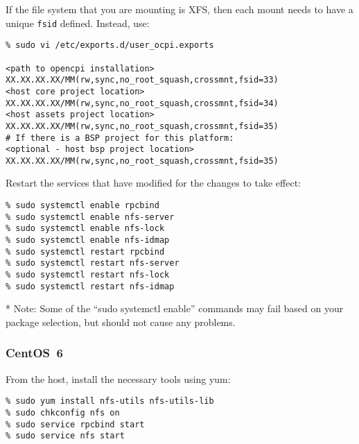 If the file system that you are mounting is XFS, then each mount needs to have a unique \texttt{fsid} defined. Instead, use:
\begin{verbatim}
% sudo vi /etc/exports.d/user_ocpi.exports

<path to opencpi installation>          XX.XX.XX.XX/MM(rw,sync,no_root_squash,crossmnt,fsid=33)
<host core project location>            XX.XX.XX.XX/MM(rw,sync,no_root_squash,crossmnt,fsid=34)
<host assets project location>          XX.XX.XX.XX/MM(rw,sync,no_root_squash,crossmnt,fsid=35)
# If there is a BSP project for this platform:
<optional - host bsp project location>  XX.XX.XX.XX/MM(rw,sync,no_root_squash,crossmnt,fsid=35)
\end{verbatim}

Restart the services that have modified for the changes to take effect:
\begin{verbatim}
% sudo systemctl enable rpcbind
% sudo systemctl enable nfs-server
% sudo systemctl enable nfs-lock
% sudo systemctl enable nfs-idmap
% sudo systemctl restart rpcbind
% sudo systemctl restart nfs-server
% sudo systemctl restart nfs-lock
% sudo systemctl restart nfs-idmap
\end{verbatim}

* Note: Some of the ``sudo systemctl enable'' commands may fail based on your package selection, but should not cause any problems.

\subsubsection{CentOS~6}
From the host, install the necessary tools using yum:
\begin{verbatim}
% sudo yum install nfs-utils nfs-utils-lib
% sudo chkconfig nfs on
% sudo service rpcbind start
% sudo service nfs start
\end{verbatim}

